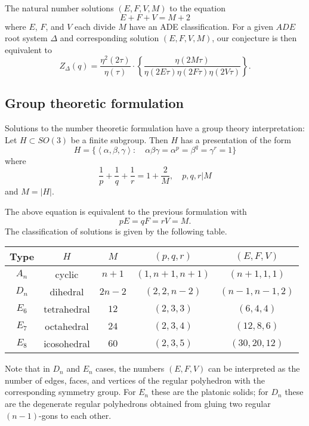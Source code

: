 \documentclass{article}
\theoremstyle{definition}
\begin{document}
The natural number solutions $(E,F,V,M)$ to the equation
\[
E+F+V=M+2
\]
where $E$, $F$, and $V$ each divide $M$
have an ADE classification. For a given $ADE$ root system $\Delta $ and
corresponding solution $ (E,F,V,M)$, our conjecture is then equivalent to
\[
Z_{\Delta } (q)= \frac{\eta^{2}(2\tau )}{\eta (\tau )} \cdot \left\{\frac{\eta
(2M\tau ) }{\eta (2E\tau )\eta (2F\tau )\eta (2V\tau )} \right\} .
\]

\subsection{Group theoretic formulation}

Solutions to the number theoretic formulation have a group theory
interpretation: Let $H\subset SO(3)$ be a finite subgroup. Then $H$
has a presentation of the form
\[
H=\{\left\langle \alpha ,\beta ,\gamma \right\rangle :\quad \alpha \beta \gamma =\alpha^{p}=\beta^{q}=\gamma^{r}=1 \}
\]
where 
\[
\frac{1}{p} + \frac{1}{q} + \frac{1}{r} =1+\frac{2}{M}, \quad p,q,r|
M 
\]
and $M=|H|$.

The above equation is equivalent to the previous formulation with 
\[
p E=q F= r V = M.
\]
The classification of solutions is given by the following table. 

\begin{center}
\begin{tabular}{|c|c|c|c|c|}
\hline
Type &	$H$ &	$M$&	$(p,q,r)$ &	$(E,F,V)$\\ \hline \hline 
$A_{n}$     & cyclic & $n+1$ & $(1,n+1,n+1)$& $(n+1,1,1)$	\\ \hline
$D_{n}$     & dihedral & $2n-2$ & $(2,2,n-2)$& $(n-1,n-1,2)$	\\ \hline
$E_{6}$     & tetrahedral & $12$ & $(2,3,3)$& $(6,4,4)$	\\ \hline
$E_{7}$     & octahedral & $24$ & $(2,3,4)$& $(12,8,6)$	\\ \hline
$E_{8}$     & icosohedral & $60$ & $(2,3,5)$& $(30,20,12)$	\\ \hline
\end{tabular}
\end{center}


Note that in $D_{n}$ and $E_{n}$ cases, the numbers $(E,F,V)$ can be
interpreted as the number of edges, faces, and vertices of the regular
polyhedron with the corresponding symmetry group. For $E_{n}$ these
are the platonic solids; for $D_{n}$ these are the degenerate regular
polyhedrons obtained from gluing two regular $(n-1)$-gons to each
other.
\end{document}
